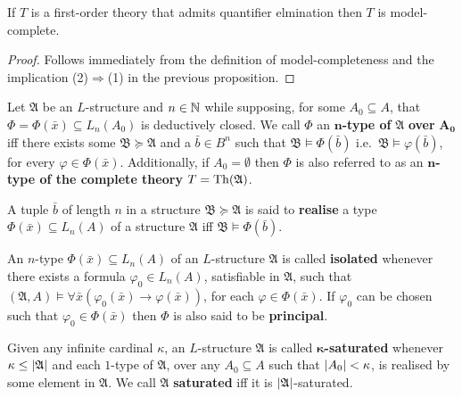 \begin{cor}\label{cor:qemc}
	If $T$ is a first-order theory that admits quantifier elmination then $T$ is model-complete.
\end{cor}
\begin{proof}
	Follows immediately from the definition of model-completeness and the implication (2)$\Rightarrow$(1) in the previous proposition.
\end{proof}

\begin{dfn}[$n$-Type]
	Let $\mathfrak{A}$ be an $L$-structure and $n\in\mathbb{N}$ while supposing, for some $A_0\subseteq A$, that $\Phi=\Phi(\bar{x})\subseteq L_n(A_0)$ is deductively closed.  We call $\Phi$ an $\mathbf{n}$\textbf{-type of }$\bm{\mathfrak{A}}$\textbf{ over }$\bm{A_0}$ iff there exists some $\mathfrak{B}\succcurlyeq\mathfrak{A}$ and a $\bar{b}\in B^n$ such that $\mathfrak{B}\models\Phi(\bar{b})$ i.e.\ $\mathfrak{B}\models\varphi(\bar{b})$, for every $\varphi\in\Phi(\bar{x})$.  Additionally, if $A_0=\emptyset$ then $\Phi$ is also referred to as an $\mathbf{n}$\textbf{-type of the complete theory }$T=\operatorname{Th}(\mathfrak{A})$.
\end{dfn}

\begin{dfn}[Realisation]
	A tuple $\bar{b}$ of length $n$ in a structure $\mathfrak{B}\succcurlyeq\mathfrak{A}$ is said to \textbf{realise} a type $\Phi(\bar{x})\subseteq L_n(A)$ of a structure $\mathfrak{A}$ iff $\mathfrak{B}\models\Phi(\bar{b})$.
\end{dfn}

\begin{dfn}
	An $n$-type $\Phi(\bar{x})\subseteq L_n(A)$ of an $L$-structure $\mathfrak{A}$ is called \textbf{isolated} whenever there exists a formula $\varphi_0\in L_n(A)$, satisfiable in $\mathfrak{A}$, such that $(\mathfrak{A},A)\models\forall\bar{x}(\varphi_0(\bar{x})\rightarrow\varphi(\bar{x}))$, for each $\varphi\in\Phi(\bar{x})$.  If $\varphi_0$ can be chosen such that $\varphi_0\in\Phi(\bar{x})$ then $\Phi$ is also said to be \textbf{principal}.
\end{dfn}

\begin{dfn}[Saturation]
	Given any infinite cardinal $\kappa$, an $L$-structure $\mathfrak{A}$ is called $\bm{\kappa}$\textbf{-saturated} whenever $\kappa\leq\left\lvert\mathfrak{A}\right\rvert$ and each $1$-type of $\mathfrak{A}$, over any $A_0\subseteq A$ such that $\left\lvert A_0\right\rvert<\kappa$, is realised by some element in $\mathfrak{A}$.  We call $\mathfrak{A}$ \textbf{saturated} iff it is $\left\lvert\mathfrak{A}\right\rvert$-saturated.
\end{dfn}

